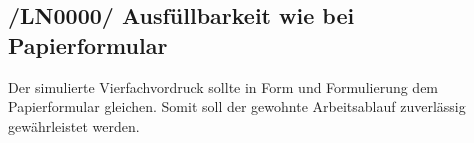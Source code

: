 \subsection{/LN0000/ Ausfüllbarkeit wie bei Papierformular}
Der simulierte Vierfachvordruck sollte in Form und Formulierung dem Papierformular gleichen. Somit soll der gewohnte Arbeitsablauf zuverlässig gewährleistet werden. 